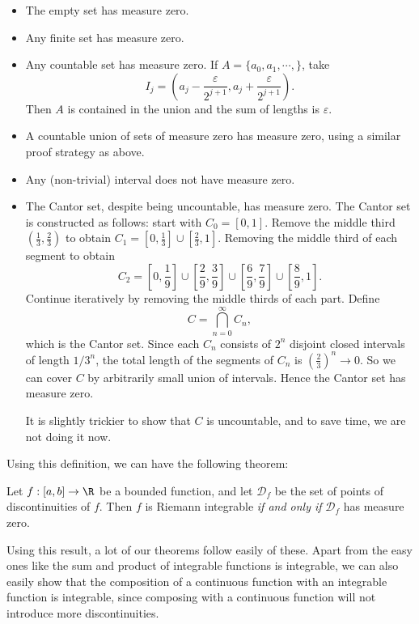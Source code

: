 \documentclass[a4paper]{article}
\begin{document}
\begin{eg}\leavevmode
  \begin{itemize}
    \item The empty set has measure zero.
    \item Any finite set has measure zero.
    \item Any countable set has measure zero. If $A = \{a_0, a_1, \cdots, \}$, take
      \[
        I_j = \left(a_j - \frac{\varepsilon}{2^{j + 1}}, a_j + \frac{\varepsilon}{2^{j + 1}}\right).
      \]
      Then $A$ is contained in the union and the sum of lengths is $\varepsilon$.
    \item A countable union of sets of measure zero has measure zero, using a similar proof strategy as above.
    \item Any (non-trivial) interval does not have measure zero.
    \item The Cantor set, despite being uncountable, has measure zero. The Cantor set is constructed as follows: start with $C_0 = [0, 1]$. Remove the middle third $\left(\frac{1}{3}, \frac{2}{3}\right)$ to obtain $C_1 = \left[0, \frac{1}{3}\right] \cup \left[\frac{2}{3}, 1\right]$. Removing the middle third of each segment to obtain
      \[
        C_2 = \left[0, \frac{1}{9}\right] \cup \left[\frac{2}{9}, \frac{3}{9}\right] \cup \left[\frac{6}{9}, \frac{7}{9}\right]\cup \left[\frac{8}{9}, 1\right].
      \]
      Continue iteratively by removing the middle thirds of each part. Define
      \[
        C = \bigcap_{n = 0}^\infty C_n,
      \]
      which is the Cantor set. Since each $C_n$ consists of $2^n$ disjoint closed intervals of length $1/3^n$, the total length of the segments of $C_n$ is $\left(\frac{2}{3}\right)^n \to 0$. So we can cover $C$ by arbitrarily small union of intervals. Hence the Cantor set has measure zero.

      It is slightly trickier to show that $C$ is uncountable, and to save time, we are not doing it now.
  \end{itemize}
\end{eg}
Using this definition, we can have the following theorem:
\begin{thm}
  Let $f: [a, b] \to \R$ be a bounded function, and let $\mathcal{D}_f$ be the set of points of discontinuities of $f$. Then $f$ is Riemann integrable \emph{if and only if} $\mathcal{D}_f$ has measure zero.
\end{thm}
Using this result, a lot of our theorems follow easily of these. Apart from the easy ones like the sum and product of integrable functions is integrable, we can also easily show that the composition of a continuous function with an integrable function is integrable, since composing with a continuous function will not introduce more discontinuities.
\end{document}
